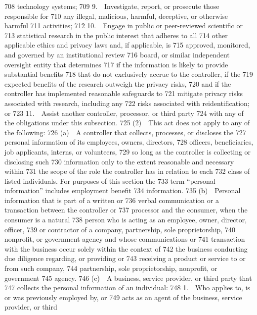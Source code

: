   708  technology systems;
  709         9. Investigate, report, or prosecute those responsible for
  710  any illegal, malicious, harmful, deceptive, or otherwise harmful
  711  activities;
  712         10. Engage in public or peer-reviewed scientific or
  713  statistical research in the public interest that adheres to all
  714  other applicable ethics and privacy laws and, if applicable, is
  715  approved, monitored, and governed by an institutional review
  716  board, or similar independent oversight entity that determines
  717  if the information is likely to provide substantial benefits
  718  that do not exclusively accrue to the controller, if the
  719  expected benefits of the research outweigh the privacy risks,
  720  and if the controller has implemented reasonable safeguards to
  721  mitigate privacy risks associated with research, including any
  722  risks associated with reidentification; or
  723         11. Assist another controller, processor, or third party
  724  with any of the obligations under this subsection.
  725         (2) This act does not apply to any of the following:
  726         (a) A controller that collects, processes, or discloses the
  727  personal information of its employees, owners, directors,
  728  officers, beneficiaries, job applicants, interns, or volunteers,
  729  so long as the controller is collecting or disclosing such
  730  information only to the extent reasonable and necessary within
  731  the scope of the role the controller has in relation to each
  732  class of listed individuals. For purposes of this section the
  733  term “personal information” includes employment benefit
  734  information.
  735         (b) Personal information that is part of a written or
  736  verbal communication or a transaction between the controller or
  737  processor and the consumer, when the consumer is a natural
  738  person who is acting as an employee, owner, director, officer,
  739  or contractor of a company, partnership, sole proprietorship,
  740  nonprofit, or government agency and whose communications or
  741  transaction with the business occur solely within the context of
  742  the business conducting due diligence regarding, or providing or
  743  receiving a product or service to or from such company,
  744  partnership, sole proprietorship, nonprofit, or government
  745  agency.
  746         (c) A business, service provider, or third party that
  747  collects the personal information of an individual:
  748         1. Who applies to, is or was previously employed by, or
  749  acts as an agent of the business, service provider, or third
